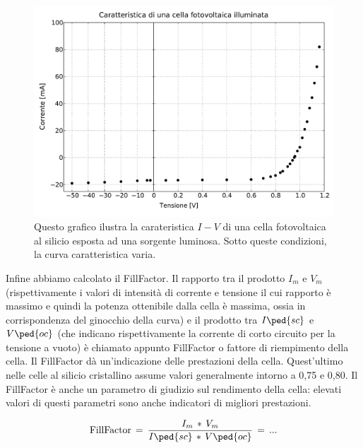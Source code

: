 \begin{figure}
    \includegraphics[scale=0.5]{luce.pdf}
    \caption{Questo grafico ilustra la carateristica $I-V$ di una cella fotovoltaica al silicio esposta ad una sorgente luminosa. Sotto queste condizioni, la curva caratteristica varia.}
    \label{fig:luce}
\end{figure}

Infine abbiamo calcolato il FillFactor. Il rapporto tra il prodotto $I_m$ e $V_m$ (rispettivamente i valori di intensità di corrente e tensione il cui rapporto è massimo e quindi la potenza ottenibile dalla cella è massima, ossia in corrispondenza del ginocchio della curva) e il prodotto tra $I\ped{sc}$ e $V\ped{oc}$ (che indicano rispettivamente la corrente di corto circuito per la tensione a vuoto) è chiamato appunto FillFactor o fattore di riempimento della cella.
Il FillFactor dà un’indicazione delle prestazioni della cella.
Quest’ultimo nelle celle al silicio cristallino assume valori generalmente intorno a 0,75 e 0,80. Il FillFactor è anche un parametro di giudizio sul rendimento della cella: elevati valori di questi parametri sono anche indicatori di migliori prestazioni.

\begin{equation}
	\text{FillFactor} \,=\, \frac{I_m\,*\,V_m}{I\ped{sc}\,*\,V\ped{oc}} \,=\, ...
\end{equation}

